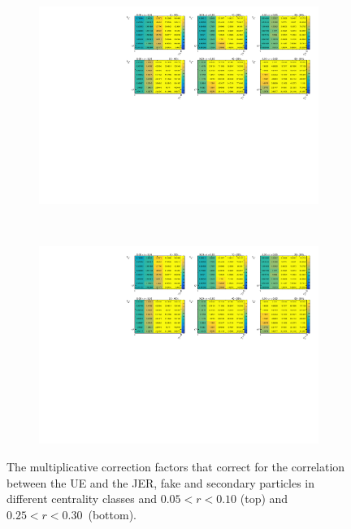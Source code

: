 \begin{figure}
\centering
\begin{subfigure}{1.\textwidth}
\centering \includegraphics[page=2,width=1.\textwidth]{figures/main/UE/UE_factors.pdf}
\caption{}
\label{fig:UEweights_r2}
\end{subfigure} \\
\begin{subfigure}{1.\textwidth}
\centering \includegraphics[page=6,width=1.\textwidth]{figures/main/UE/UE_factors.pdf}
\caption{}
\label{fig:UEweights_r6}
\end{subfigure}
\caption{The multiplicative correction factors that correct for the correlation between the UE and the JER, fake and secondary particles in different centrality classes and \mbox{$ 0.05 < r < 0.10$} (top) and \mbox{$ 0.25 < r < 0.30$ (bottom)}.}
\label{fig:UEweights}
\end{figure}

